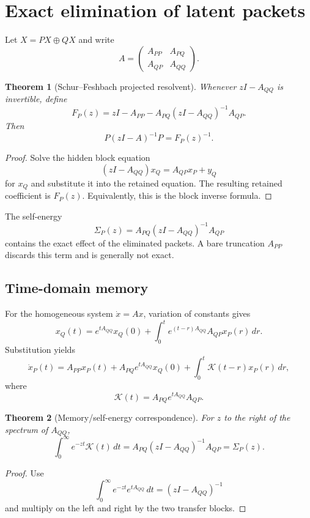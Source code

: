 \documentclass[11pt]{article}
\newtheorem{theorem}{Theorem}[section]
\theoremstyle{definition}
\theoremstyle{remark}
\newcommand{\cK}{\mathcal K}
\begin{document}
\section{Exact elimination of latent packets}

Let $X=P X\oplus Q X$ and write
\[
A=
\begin{pmatrix}
A_{PP}&A_{PQ}\\
A_{QP}&A_{QQ}
\end{pmatrix}.
\]

\begin{theorem}[Schur--Feshbach projected resolvent]
Whenever $zI-A_{QQ}$ is invertible, define
\[
\boxed{
F_P(z)
=zI-A_{PP}-A_{PQ}(zI-A_{QQ})^{-1}A_{QP}.
}
\]
Then
\[
\boxed{
P(zI-A)^{-1}P=F_P(z)^{-1}.
}
\]
\end{theorem}

\begin{proof}
Solve the hidden block equation
\[
(zI-A_{QQ})x_Q=A_{QP}x_P+y_Q
\]
for $x_Q$ and substitute it into the retained equation. The resulting retained coefficient is $F_P(z)$. Equivalently, this is the block inverse formula.
\end{proof}

The self-energy
\[
\Sigma_P(z)=A_{PQ}(zI-A_{QQ})^{-1}A_{QP}
\]
contains the exact effect of the eliminated packets. A bare truncation $A_{PP}$ discards this term and is generally not exact.

\subsection{Time-domain memory}

For the homogeneous system $\dot x=Ax$, variation of constants gives
\[
x_Q(t)=e^{tA_{QQ}}x_Q(0)
+\int_0^te^{(t-r)A_{QQ}}A_{QP}x_P(r)\,dr.
\]
Substitution yields
\[
\dot x_P(t)
=A_{PP}x_P(t)+A_{PQ}e^{tA_{QQ}}x_Q(0)
+\int_0^t\cK(t-r)x_P(r)\,dr,
\]
where
\[
\boxed{
\cK(t)=A_{PQ}e^{tA_{QQ}}A_{QP}.
}
\]

\begin{theorem}[Memory/self-energy correspondence]
For $z$ to the right of the spectrum of $A_{QQ}$,
\[
\boxed{
\int_0^\infty e^{-zt}\cK(t)\,dt
=A_{PQ}(zI-A_{QQ})^{-1}A_{QP}
=\Sigma_P(z).
}
\]
\end{theorem}

\begin{proof}
Use
\[
\int_0^\infty e^{-zt}e^{tA_{QQ}}\,dt=(zI-A_{QQ})^{-1}
\]
and multiply on the left and right by the two transfer blocks.
\end{proof}
\end{document}
